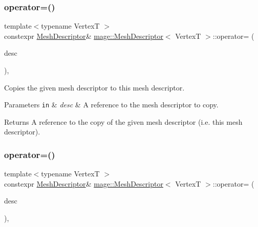 \subsubsection{\texorpdfstring{operator=()}{operator=()}\hspace{0.1cm}{\footnotesize\ttfamily [1/2]}}
{\footnotesize\ttfamily template$<$typename VertexT $>$ \\
constexpr \hyperlink{structmage_1_1_mesh_descriptor}{Mesh\+Descriptor}\& \hyperlink{structmage_1_1_mesh_descriptor}{mage\+::\+Mesh\+Descriptor}$<$ VertexT $>$\+::operator= (\begin{DoxyParamCaption}\item[{const \hyperlink{structmage_1_1_mesh_descriptor}{Mesh\+Descriptor}$<$ VertexT $>$ \&}]{desc }\end{DoxyParamCaption})\hspace{0.3cm}{\ttfamily [default]}, {\ttfamily [noexcept]}}

Copies the given mesh descriptor to this mesh descriptor.


\begin{DoxyParams}[1]{Parameters}
\mbox{\tt in}  & {\em desc} & A reference to the mesh descriptor to copy. \\
\hline
\end{DoxyParams}
\begin{DoxyReturn}{Returns}
A reference to the copy of the given mesh descriptor (i.\+e. this mesh descriptor). 
\end{DoxyReturn}
\hypertarget{structmage_1_1_mesh_descriptor_a4076b38f6ab4c567c2aa459cdf815796}{}\label{structmage_1_1_mesh_descriptor_a4076b38f6ab4c567c2aa459cdf815796} 
\subsubsection{\texorpdfstring{operator=()}{operator=()}\hspace{0.1cm}{\footnotesize\ttfamily [2/2]}}
{\footnotesize\ttfamily template$<$typename VertexT $>$ \\
constexpr \hyperlink{structmage_1_1_mesh_descriptor}{Mesh\+Descriptor}\& \hyperlink{structmage_1_1_mesh_descriptor}{mage\+::\+Mesh\+Descriptor}$<$ VertexT $>$\+::operator= (\begin{DoxyParamCaption}\item[{\hyperlink{structmage_1_1_mesh_descriptor}{Mesh\+Descriptor}$<$ VertexT $>$ \&\&}]{desc }\end{DoxyParamCaption})\hspace{0.3cm}{\ttfamily [default]}, {\ttfamily [noexcept]}}

